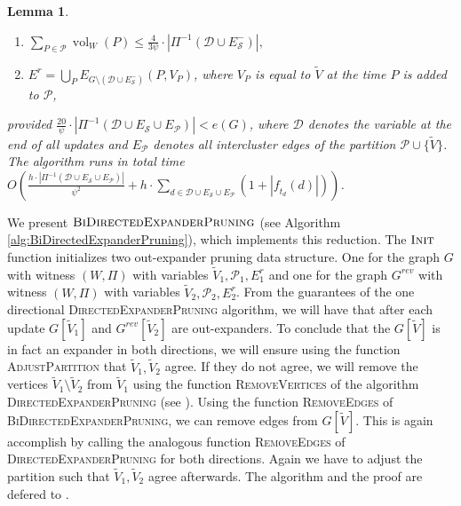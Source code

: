 \documentclass[11pt]{article}
\newtheorem{lemma}[theorem]{Lemma}
\newcommand\ff{\boldsymbol{\mathit{f}}}
\begin{document}
\begin{lemma}
\begin{enumerate}
    \item \label{itm:DEP-lm3} $\sum_{P \in \mathcal{P}} \operatorname{vol}_W(P) \leq \frac{4}{3 \psi} \cdot \left|\Pi^{-1}(\mathcal{D} \cup E^-_{\mathcal{S}}) \right|, $
    \item \label{itm:DEP-lm4} $E^r = \bigcup_{P} E_{G \setminus (\mathcal{D} \cup E^-_{\mathcal{S}})}(P,V_P)$, where $V_P$ is equal to $\tilde{V}$ at the time $P$ is added to $\mathcal{P}$,
\end{enumerate}
provided $\frac{20}{\psi} \cdot  |\Pi^{-1}(\mathcal{D} \cup E_{\mathcal{S}} \cup E_{\mathcal{P}})| < e(G)$, where $\mathcal{D}$ denotes the variable at the end of all updates and $E_{\mathcal{P}}$ denotes all intercluster edges of the partition $\mathcal{P} \cup \{\tilde{V}\}$. The algorithm runs in total time $O\left(\frac{h \cdot |\Pi^{-1}(\mathcal{D} \cup E_{\mathcal{S}} \cup E_{\mathcal{P}})|}{\psi^2} + h \cdot \sum_{d \in \mathcal{D} \cup E_{\mathcal{S}} \cup E_{\mathcal{P}}} (1 + |\ff_{t_d}(d)|)\right)$.
\end{lemma}

We present $\textsc{BiDirectedExpanderPruning}$ (see Algorithm \ref{alg:BiDirectedExpanderPruning}), which implements this reduction. The $\textsc{Init}$ function initializes two out-expander pruning data structure. One for the graph $G$ with witness $(W, \Pi)$ with variables $\tilde{V}_1, \mathcal{P}_1, E^r_1$ and one for the graph $G^{rev}$ with witness $(W, \Pi)$ with variables $\tilde{V}_2, \mathcal{P}_2, E^r_2$. From the guarantees of the one directional \textsc{DirectedExpanderPruning} algorithm, we will have that after each update $G[\tilde{V}_1]$ and $G^{rev}[\tilde{V}_2]$ are out-expanders. To conclude that the $G[\tilde{V}]$ is in fact an expander in both directions, we will ensure using the function \textsc{AdjustPartition} that $\tilde{V}_1, \tilde{V}_2$ agree. If they do not agree, we will remove the vertices $\tilde{V}_1 \setminus \tilde{V}_2 $ from $\tilde{V}_1$ using the function \textsc{RemoveVertices} of the algorithm \textsc{DirectedExpanderPruning} (see ). Using the function \textsc{RemoveEdges} of \textsc{BiDirectedExpanderPruning}, we can remove edges from $G[\tilde{V}]$. This is again accomplish by calling the analogous function \textsc{RemoveEdges} of \textsc{DirectedExpanderPruning} for both directions. Again we have to adjust the partition such that $\tilde{V}_1, \tilde{V}_2$ agree afterwards. The algorithm and the proof are defered to .
\end{document}
